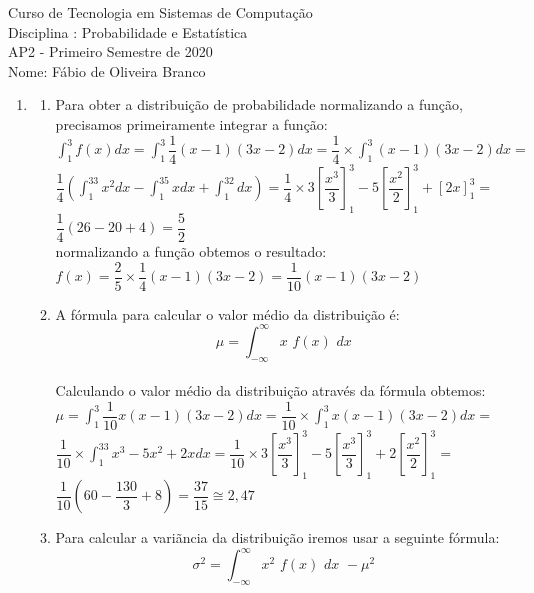 \documentclass[a4paper, 12pt]{article}
\begin{document}
\begin{center}
Curso de Tecnologia em Sistemas de Computação \\
Disciplina : Probabilidade e Estatística \\
AP2 - Primeiro Semestre de 2020 \\
Nome: Fábio de Oliveira Branco\\ 
\end{center}


\begin{enumerate}
\item \begin{enumerate}
\item Para obter a distribuição de probabilidade normalizando a função, precisamos primeiramente integrar a função:\\
$\int_{1}^{3} f(x)dx = \int _1^3\dfrac{1}{4}\left(x-1\right)\left(3x-2\right)dx= \dfrac{1}{4}\times \int _1^3\left(x-1\right)\left(3x-2\right)dx=$\\
$\dfrac{1}{4}\left(\int _1^33x^2dx-\int _1^35xdx+\int _1^32dx\right)= \dfrac{1}{4} \times 3\left[\dfrac{x^3}{3}\right]^3_1 - 5\left[\dfrac{x^2}{2}\right]^3_1 + \left[2x\right]^3_1 =$\\
$\dfrac{1}{4}\left(26-20+4\right) = \dfrac{5}{2}$ \\ 

normalizando a função obtemos o resultado: \\
$f(x)= \dfrac{2}{5} \times \dfrac{1}{4}(x-1)(3x-2) = \dfrac{1}{10}(x-1)(3x-2)$

\item A fórmula para calcular o valor médio da distribuição é:\\ $$\mu =  \int _{-\infty}^{\infty}x \,\, f(x) \,\, dx$$\\ 
Calculando o valor médio da distribuição através da fórmula obtemos: \\
$\mu = \int _1^3\dfrac{1}{10}x\left(x-1\right)\left(3x-2\right)dx = \dfrac{1}{10}\times \int _1^3x\left(x-1\right)\left(3x-2\right)dx =$\\
$\dfrac{1}{10}\times \int _1^33x^3-5x^2+2xdx =\dfrac{1}{10} \times 3\left[\dfrac{x^3}{3}\right]^3_1 -5\left[\dfrac{x^3}{3}\right]^3_1 + 2\left[\dfrac{x^2}{2}\right]^3_1 =  $ \\
$\dfrac{1}{10}\left(60-\dfrac{130}{3}+8\right) = \dfrac{37}{15} \cong 2,47$

\item Para calcular a variãncia da distribuição iremos usar a seguinte fórmula: \\
$$\sigma^2 = \int_{-\infty}^{\infty} x^2 \,\, f(x) \,\, dx \,\, - \mu^2$$\\


\end{enumerate}
\end{enumerate}
\end{document}
